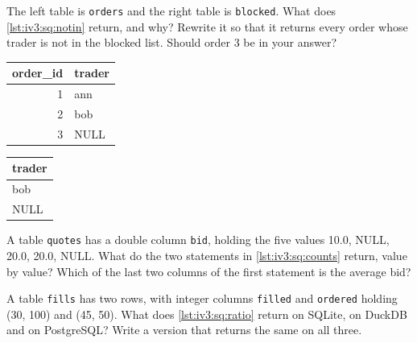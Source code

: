 \begin{question}\label{iq:iv3:sql-and-data:3}
The left table is \texttt{orders} and the right table is \texttt{blocked}. What does \cref{lst:iv3:sq:notin} return, and why? Rewrite it so that it returns every order whose trader is not in the blocked list. Should order 3 be in your answer?
\begin{center}\small
\begin{tabular}{rl}
order\_id & trader\\\hline
1 & ann\\
2 & bob\\
3 & NULL
\end{tabular}\qquad
\begin{tabular}{l}
trader\\\hline
bob\\
NULL
\end{tabular}
\end{center}
\label{lst:iv3:sq:notin}
\end{question}

\begin{question}\label{iq:iv3:sql-and-data:4}
A table \texttt{quotes} has a double column \texttt{bid}, holding the five values 10.0, NULL, 20.0, 20.0, NULL. What do the two statements in \cref{lst:iv3:sq:counts} return, value by value? Which of the last two columns of the first statement is the average bid?
\label{lst:iv3:sq:counts}
\end{question}

\begin{question}\label{iq:iv3:sql-and-data:5}
A table \texttt{fills} has two rows, with integer columns \texttt{filled} and \texttt{ordered} holding (30, 100) and (45, 50). What does \cref{lst:iv3:sq:ratio} return on SQLite, on DuckDB and on PostgreSQL? Write a version that returns the same on all three.
\label{lst:iv3:sq:ratio}
\end{question}

